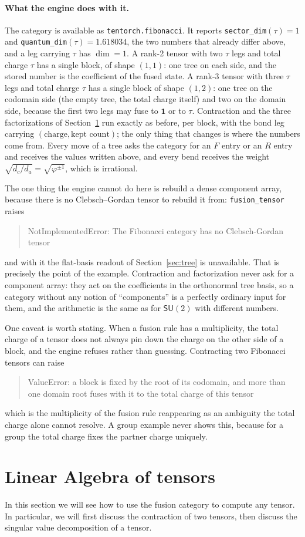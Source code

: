 \paragraph{What the engine does with it.} The category is available as
\texttt{tentorch.fibonacci}. It reports \texttt{sector\_dim}$(\tau)=1$ and
\texttt{quantum\_dim}$(\tau)=1.618034$, the two numbers that already differ above, and a
leg carrying $\tau$ has $\dim=1$. A rank-2 tensor with two $\tau$ legs and total charge
$\tau$ has a single block, of shape $(1,1)$: one tree on each side, and the stored
number is the coefficient of the fused state. A rank-3 tensor with three $\tau$ legs and
total charge $\tau$ has a single block of shape $(1,2)$: one tree on the codomain side
(the empty tree, the total charge itself) and two on the domain side, because the first
two legs may fuse to $\mathbf 1$ or to $\tau$. Contraction and the three factorizations
of Section~\ref{sec:linalg} run exactly as before, per block, with the bond
leg carrying $(\text{charge},\text{kept count})$; the only thing that changes is where
the numbers come from. Every move of a tree asks the category for an $F$ entry or an $R$
entry and receives the values written above, and every bend receives the weight
$\sqrt{d_c/d_a}=\sqrt{\varphi^{\pm1}}$, which is irrational.

The one thing the engine cannot do here is rebuild a dense component array, because
there is no Clebsch--Gordan tensor to rebuild it from:
\texttt{fusion\_tensor} raises
\begin{quote}\small\ttfamily\raggedright
NotImplementedError: The Fibonacci category has no Clebsch-Gordan tensor
\end{quote}
and with it the flat-basis readout of Section~\ref{sec:tree} is unavailable. That is precisely the point of the example.
Contraction and factorization never ask for a component array: they act on the
coefficients in the orthonormal tree basis, so a category without any notion of
``components'' is a perfectly ordinary input for them, and the arithmetic is the same as
for $\mathsf{SU}(2)$ with different numbers.

One caveat is worth stating. When a fusion rule has a multiplicity, the total charge of
a tensor does not always pin down the charge on the other side of a block, and the
engine refuses rather than guessing. Contracting two Fibonacci tensors can raise
\begin{quote}\small\ttfamily\raggedright
ValueError: a block is fixed by the root of its codomain, and more than one domain root
fuses with it to the total charge of this tensor
\end{quote}
which is the multiplicity of the fusion rule reappearing as an ambiguity the total
charge alone cannot resolve. A group example never shows this, because for a group the
total charge fixes the partner charge uniquely.

\section{Linear Algebra of tensors}
\label{sec:linalg}
In this section we will see how to use the fusion category to compute any tensor. In particular, we will first discuss the contraction of two tensors, then discuss the singular value decomposition of a tensor. 